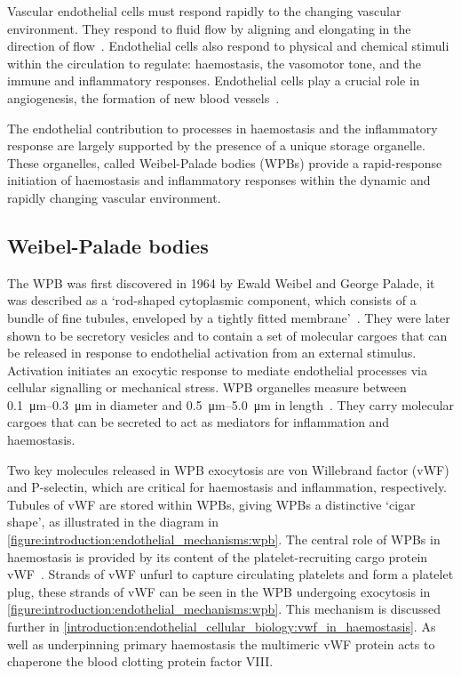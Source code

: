 Vascular endothelial cells must respond rapidly to the changing vascular environment. They respond to fluid flow by aligning and elongating in the direction of flow~\cite{Eskin1984}. Endothelial cells also respond to physical and chemical stimuli within the circulation to regulate: haemostasis, the vasomotor tone, and the immune and inflammatory responses. Endothelial cells play a crucial role in angiogenesis, the formation of new blood vessels~\cite{Sumpio2002}.

The endothelial contribution to processes in haemostasis and the inflammatory response are largely supported by the presence of a unique storage organelle. These organelles, called Weibel-Palade bodies (WPBs) provide a rapid-response initiation of haemostasis and inflammatory responses within the dynamic and rapidly changing vascular environment.

\subsection{Weibel-Palade bodies}
\label{introduction:endothelial_cellular_biology:wpb}
The WPB was first discovered in 1964 by Ewald Weibel and George Palade, it was described as a `rod-shaped cytoplasmic component, which consists of a bundle of fine tubules, enveloped by a tightly fitted membrane'~\cite{Weibel1964}. They were later shown to be secretory vesicles and to contain a set of molecular cargoes that can be released in response to endothelial activation from an external stimulus. Activation initiates an exocytic response to mediate endothelial processes via cellular signalling or mechanical stress. WPB organelles measure between \SIrange{0.1}{0.3}{\micro\meter} in diameter and \SIrange{0.5}{5.0}{\micro\meter} in length~\cite{Ferraro2014}. They carry molecular cargoes that can be secreted to act as  mediators for inflammation and haemostasis.

Two key molecules released in WPB exocytosis are von Willebrand factor (vWF) and P-selectin, which are critical for haemostasis and inflammation, respectively. Tubules of vWF are stored within WPBs, giving WPBs a distinctive `cigar shape', as illustrated in the diagram in \autoref{figure:introduction:endothelial_mechanisms:wpb}. The central role of WPBs in haemostasis is provided by its content of the platelet-recruiting cargo protein vWF~\cite{Wagner1982}. Strands of vWF unfurl to capture circulating platelets and form a platelet plug, these strands of vWF can be seen in the WPB undergoing exocytosis in \autoref{figure:introduction:endothelial_mechanisms:wpb}. This mechanism is discussed further in \autoref{introduction:endothelial_cellular_biology:vwf_in_haemostasis}. As well as underpinning primary haemostasis the multimeric vWF protein acts to chaperone the blood clotting protein factor VIII.

